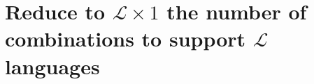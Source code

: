 

\section{Reduce to $\mathcal{L} \times 1$ the number of combinations to support $\mathcal{L}$ languages}


